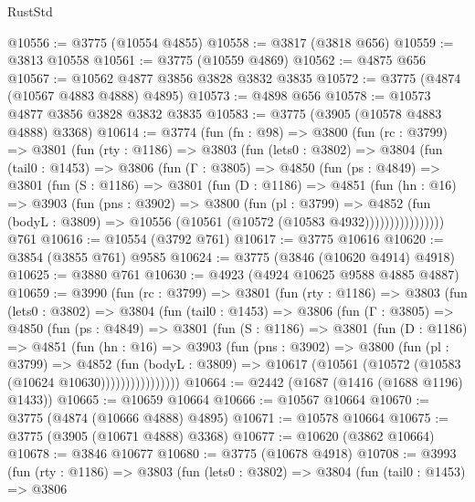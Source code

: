 \begin{lexlean}{RustStd}
\begin{coremodule}
@10556 := @3775 (@10554 @4855)
@10558 := @3817 (@3818 @656)
@10559 := @3813 @10558
@10561 := @3775 (@10559 @4869)
@10562 := @4875 @656
@10567 := @10562 @4877 @3856 @3828 @3832 @3835
@10572 := @3775 (@4874 (@10567 @4883 @4888) @4895)
@10573 := @4898 @656
@10578 := @10573 @4877 @3856 @3828 @3832 @3835
@10583 := @3775 (@3905 (@10578 @4883 @4888) @3368)
@10614 := @3774
    (fun (fn : @98) =>
    @3800
      (fun (rc : @3799) =>
      @3801
        (fun (rty : @1186) =>
        @3803
          (fun (lets0 : @3802) =>
          @3804
            (fun (tail0 : @1453) =>
            @3806
              (fun (Γ : @3805) =>
              @4850
                (fun (ps : @4849) =>
                @3801
                  (fun (S : @1186) =>
                  @3801
                    (fun (D : @1186) =>
                    @4851
                      (fun (hn : @16) =>
                      @3903
                        (fun (pns : @3902) =>
                        @3800
                          (fun (pl : @3799) =>
                          @4852
                            (fun (bodyL : @3809) =>
                            @10556 (@10561 (@10572 (@10583 @4932))))))))))))))))
    @761
@10616 := @10554 (@3792 @761)
@10617 := @3775 @10616
@10620 := @3854 (@3855 @761) @9585
@10624 := @3775 (@3846 (@10620 @4914) @4918)
@10625 := @3880 @761
@10630 := @4923 (@4924 @10625 @9588 @4885 @4887)
@10659 := @3990
    (fun (rc : @3799) =>
    @3801
      (fun (rty : @1186) =>
      @3803
        (fun (lets0 : @3802) =>
        @3804
          (fun (tail0 : @1453) =>
          @3806
            (fun (Γ : @3805) =>
            @4850
              (fun (ps : @4849) =>
              @3801
                (fun (S : @1186) =>
                @3801
                  (fun (D : @1186) =>
                  @4851
                    (fun (hn : @16) =>
                    @3903
                      (fun (pns : @3902) =>
                      @3800
                        (fun (pl : @3799) =>
                        @4852
                          (fun (bodyL : @3809) =>
                          @10617 (@10561 (@10572 (@10583 (@10624 @10630))))))))))))))))
@10664 := @2442 (@1687 (@1416 (@1688 @1196) @1433))
@10665 := @10659 @10664
@10666 := @10567 @10664
@10670 := @3775 (@4874 (@10666 @4888) @4895)
@10671 := @10578 @10664
@10675 := @3775 (@3905 (@10671 @4888) @3368)
@10677 := @10620 (@3862 @10664)
@10678 := @3846 @10677
@10680 := @3775 (@10678 @4918)
@10708 := @3993
    (fun (rty : @1186) =>
    @3803
      (fun (lets0 : @3802) =>
      @3804
        (fun (tail0 : @1453) =>
        @3806

\end{coremodule}
\end{lexlean}
